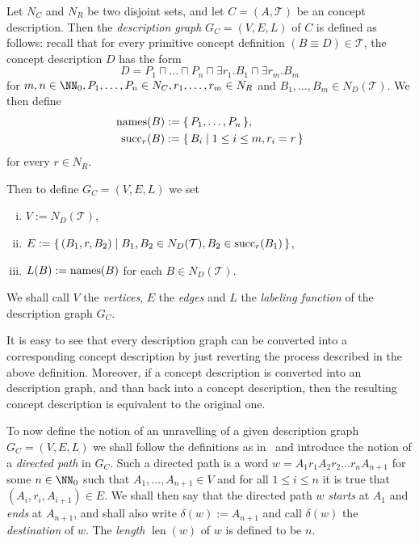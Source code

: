 \begin{Definition}
  \label{def:EL-description-graph}
  Let $N_C$ and $N_R$ be two disjoint sets, and let $C = (A, \mathcal{T})$ be an \ELgfp
  concept description.  Then the \emph{\EL description graph} $G_C = (V, E, L)$ of $C$ is
  defined as follows: recall that for every primitive concept definition $(B \equiv D) \in
  \mathcal{T}$, the concept description $D$ has the form
  \begin{equation*}
    D = P_1 \sqcap \dots \sqcap P_n \sqcap \exists r_1. B_1 \sqcap \exists r_m. B_m
  \end{equation*}
  for $m, n \in \NN_0, P_1, \dots, P_n \in N_C, r_1, \dots, r_m \in N_R$ and $B_1, \dots,
  B_m \in N_D(\mathcal{T})$.  We then define
  \begin{align*}
    \operatorname{names}(B) &:= {\{\, P_1, \dots, P_n \,\}},\\
    \operatorname{succ}_r(B) &:= {\{\, B_i \mid 1 \leq i \leq m, r_i = r \,\}}
  \end{align*}
  for every $r \in N_R$.

  Then to define $G_C = (V, E, L)$ we set
  \begin{enumerate}[i. ]
  \item $V := N_D(\mathcal{T})$,
  \item $E := {\{\, (B_1, r, B_2) \mid B_1, B_2 \in N_D(\mathcal{T}), B_2 \in
      \operatorname{succ}_r(B_1) \,\}}$,
  \item $L(B) := \operatorname{names}(B)$ for each $B \in N_D(\mathcal{T})$.
  \end{enumerate}
  We shall call $V$ the \emph{vertices}, $E$ the \emph{edges} and $L$ the \emph{labeling
    function} of the description graph $G_C$.
\end{Definition}

It is easy to see that every \EL description graph can be converted into a corresponding
concept description by just reverting the process described in the above definition.
Moreover, if a concept description is converted into an \EL description graph, and than
back into a concept description, then the resulting concept description is equivalent to
the original one.

To now define the notion of an unravelling of a given \EL description graph $G_C = (V, E,
L)$ we shall follow the definitions as in~\cite{Diss-Felix} and introduce the notion of a
\emph{directed path} in $G_C$.  Such a directed path is a word $w = A_1 r_1 A_2 r_2 \dots
r_n A_{n+1}$ for some $n \in \NN_0$ such that $A_1, \dots, A_{n+1} \in V$ and for all $1
\leq i \leq n$ it is true that $(A_i, r_i, A_{i+1}) \in E$.  We shall then say that the
directed path $w$ \emph{starts} at $A_1$ and \emph{ends} at $A_{n+1}$, and shall also
write $\delta(w) := A_{n+1}$ and call $\delta(w)$ the \emph{destination} of $w$.  The
\emph{length} $\operatorname{len}(w)$ of $w$ is defined to be $n$.

